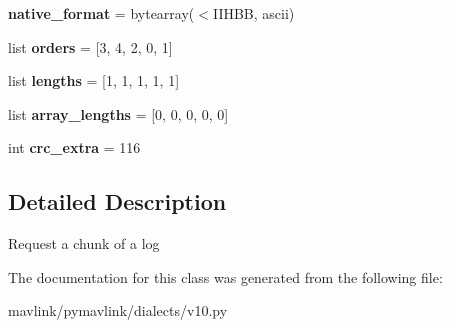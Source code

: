 \begin{DoxyCompactItemize}
\item 
\mbox{\label{classpymavlink_1_1dialects_1_1v10_1_1MAVLink__log__request__data__message_aa492b901467a00419a413ac8e0b18286}} 
{\bfseries native\+\_\+format} = bytearray(\textquotesingle{}$<$I\+I\+H\+BB\textquotesingle{}, \textquotesingle{}ascii\textquotesingle{})
\item 
\mbox{\label{classpymavlink_1_1dialects_1_1v10_1_1MAVLink__log__request__data__message_a8aad0fc7f174eab6ff480b547ea0b4f0}} 
list {\bfseries orders} = \mbox{[}3, 4, 2, 0, 1\mbox{]}
\item 
\mbox{\label{classpymavlink_1_1dialects_1_1v10_1_1MAVLink__log__request__data__message_a8e00d7c04bc23b8fce61d46e0bb06405}} 
list {\bfseries lengths} = \mbox{[}1, 1, 1, 1, 1\mbox{]}
\item 
\mbox{\label{classpymavlink_1_1dialects_1_1v10_1_1MAVLink__log__request__data__message_aa267719843f631555d94eee856d3b88c}} 
list {\bfseries array\+\_\+lengths} = \mbox{[}0, 0, 0, 0, 0\mbox{]}
\item 
\mbox{\label{classpymavlink_1_1dialects_1_1v10_1_1MAVLink__log__request__data__message_a7ed79e42ebd92292918e23242daf55b5}} 
int {\bfseries crc\+\_\+extra} = 116
\end{DoxyCompactItemize}


\subsection{Detailed Description}
\begin{DoxyVerb}Request a chunk of a log
\end{DoxyVerb}
 

The documentation for this class was generated from the following file\+:\begin{DoxyCompactItemize}
\item 
mavlink/pymavlink/dialects/v10.\+py\end{DoxyCompactItemize}
